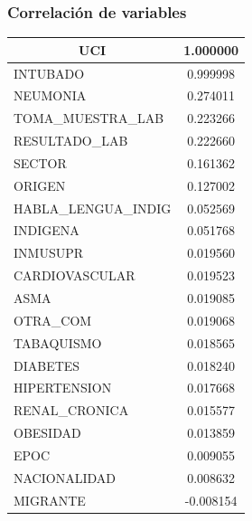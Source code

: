 \clearpage
\subsubsection{Correlación de variables}


\begin{table}[h]
\resizebox{7cm}{!} {

\begin{tabular}{|l|c|}
\hline
\multicolumn{1}{|c|}{\textbf{UCI}} & \textbf{1.000000} \\ \hline
INTUBADO                           & 0.999998          \\ \hline
NEUMONIA                           & 0.274011          \\ \hline
TOMA\_MUESTRA\_LAB                 & 0.223266          \\ \hline
RESULTADO\_LAB                     & 0.222660          \\ \hline
SECTOR                             & 0.161362          \\ \hline
ORIGEN                             & 0.127002          \\ \hline
HABLA\_LENGUA\_INDIG               & 0.052569          \\ \hline
INDIGENA                           & 0.051768          \\ \hline
INMUSUPR                           & 0.019560          \\ \hline
CARDIOVASCULAR                     & 0.019523          \\ \hline
ASMA                               & 0.019085          \\ \hline
OTRA\_COM                          & 0.019068          \\ \hline
TABAQUISMO                         & 0.018565          \\ \hline
DIABETES                           & 0.018240          \\ \hline
HIPERTENSION                       & 0.017668          \\ \hline
RENAL\_CRONICA                     & 0.015577          \\ \hline
OBESIDAD                           & 0.013859          \\ \hline
EPOC                               & 0.009055          \\ \hline
NACIONALIDAD                       & 0.008632          \\ \hline
MIGRANTE                           & -0.008154         \\ \hline

\end{tabular}}
\end{table}
